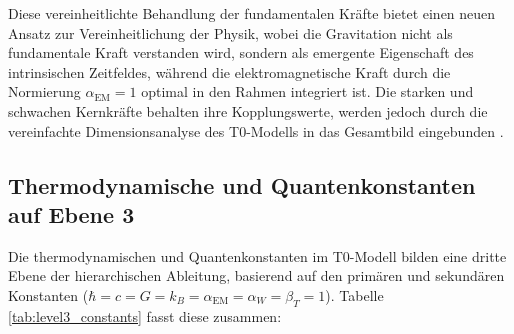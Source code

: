 \documentclass[twocolumn,aps,prl]{revtex4-2}
\begin{document}
{{{{{{{{{{{													Diese vereinheitlichte Behandlung der fundamentalen Kräfte bietet einen neuen Ansatz zur Vereinheitlichung der Physik, wobei die Gravitation nicht als fundamentale Kraft verstanden wird, sondern als emergente Eigenschaft des intrinsischen Zeitfeldes, während die elektromagnetische Kraft durch die Normierung \(\alpha_{\text{EM}} = 1\) optimal in den Rahmen integriert ist. Die starken und schwachen Kernkräfte behalten ihre Kopplungswerte, werden jedoch durch die vereinfachte Dimensionsanalyse des T0-Modells in das Gesamtbild eingebunden \cite{pascher_emergente_2025}.
													
													\subsection{Thermodynamische und Quantenkonstanten auf Ebene 3}
													\label{subsec:level3_thermo_quantum}
													
													Die thermodynamischen und Quantenkonstanten im T0-Modell bilden eine dritte Ebene der hierarchischen Ableitung, basierend auf den primären und sekundären Konstanten (\(\hbar = c = G = k_B = \alpha_{\text{EM}} = \alpha_W = \beta_T = 1\)). Tabelle \ref{tab:level3_constants} fasst diese zusammen:
													
}}}}}}}}}}}
\end{document}
